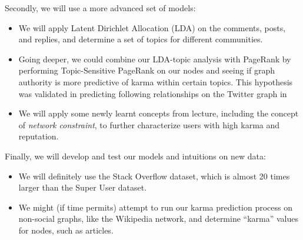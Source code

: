 \documentclass[10pt]{article}
\begin{document}
Secondly, we will use a more advanced set of models:
\begin{itemize}
  \item We will apply Latent Dirichlet Allocation (LDA) \citep{blei2003latent}
    on the comments, posts, and replies, and determine a set of topics for
    different communities.
  \item Going deeper, we could combine our LDA-topic analysis with PageRank by
    performing Topic-Sensitive PageRank \citep{haveliwala2002topic} on our nodes
    and seeing if graph authority is more predictive of karma within certain
    topics. This hypothesis was validated in predicting following relationships
    on the Twitter graph in \citet{weng2010twitterrank}
  \item We will apply some newly learnt concepts from lecture, including the
    concept of \emph{network constraint}, to further characterize users with
    high karma and reputation.
\end{itemize}

Finally, we will develop and test our models and intuitions on new data:
\begin {itemize}
  \item We will definitely use the Stack Overflow dataset, which is almost 20 times larger than the
    Super User dataset.
  \item We might (if time permits) attempt to run our karma prediction process
    on non-social graphs, like the Wikipedia network, and determine ``karma''
    values for nodes, such as articles.
\end{itemize}



\end{document}
